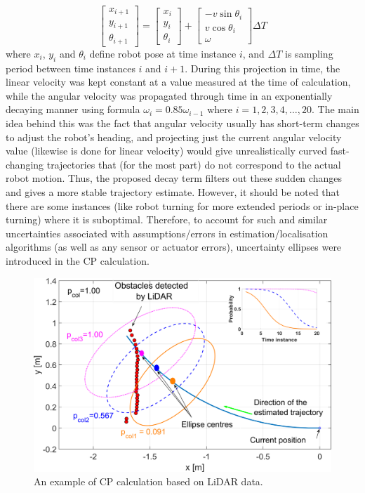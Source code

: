 \begin{equation}
    \begin{bmatrix}
        x_{i+1}\\
        y_{i+1}\\
        \theta_{i+1}
    \end{bmatrix} = 
    \begin{bmatrix}
        x_{i}\\
        y_{i}\\
        \theta_{i}
    \end{bmatrix} + 
    \begin{bmatrix}
        -v \sin{\theta_{i}}\\
        v \cos{\theta_{i}}\\
        \omega
    \end{bmatrix}\Delta T
\end{equation}
where $x_i$, $y_i$ and $\theta_i$ define robot pose at time instance $i$, and $\Delta T$ is sampling period between time instances $i$ and $i+1$.
During this projection in time, the linear velocity was kept constant at a value measured at the time of calculation, while the angular velocity was propagated through time in an exponentially decaying manner using formula $\omega_i=0.85\omega_{i-1}$ where $i=1,2,3,4,\ldots,20$. The main idea behind this was the fact that angular velocity usually has short-term changes to adjust the robot's heading, and projecting just the current angular velocity value (likewise is done for linear velocity) would give unrealistically curved fast-changing trajectories that (for the most part) do not correspond to the actual robot motion. Thus, the proposed decay term filters out these sudden changes and gives a more stable trajectory estimate. However, it should be noted that there are some instances (like robot turning for more extended periods or in-place turning) where it is suboptimal. Therefore, to account for such and similar uncertainties associated with assumptions/errors in estimation/localisation algorithms (as well as any sensor or actuator errors), uncertainty ellipses were introduced in the CP calculation.

\begin{figure}
\centering
\includegraphics[width=\columnwidth]{slike/col_prob.png}
\caption{An example of CP calculation based on LiDAR data.}
\label{Fig:Elipse2}
\end{figure}

